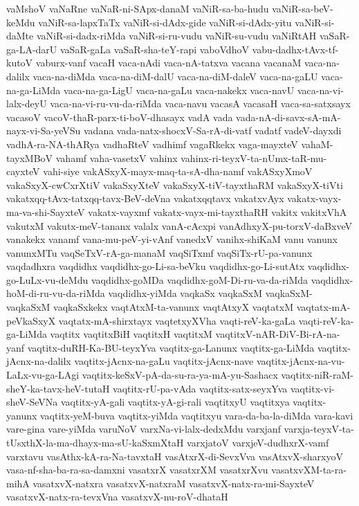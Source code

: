 {vaMshoV
vaNaRne
vaNaR-ni-SApx-danaM
vaNiR-sa-ba-hudu
vaNiR-sa-beV-keMdu
vaNiR-sa-lapxTaTx
vaNiR-si-dAdx-gide
vaNiR-si-dAdx-yitu
vaNiR-si-daMte
vaNiR-si-dadx-riMda
vaNiR-si-ru-vudu
vaNiR-su-vudu
vaNiRtAH
vaSaR-ga-LA-darU
vaSaR-gaLa
vaSaR-sha-teY-rapi
vaboVdhoV
vabu-dadhx-tAvx-tf-kutoV
vaburx-vanf
vacaH
vaca-nAdi
vaca-nA-tatxva
vacana
vacanaM
vaca-na-dalilx
vaca-na-diMda
vaca-na-diM-dalU
vaca-na-diM-daleV
vaca-na-gaLU
vaca-na-ga-LiMda
vaca-na-ga-LigU
vaca-na-gaLu
vaca-nakekx
vaca-navU
vaca-na-vi-lalx-deyU
vaca-na-vi-ru-vu-da-riMda
vaca-navu
vacasA
vacasaH
vaca-sa-satxsayx
vacasoV
vacoV-thaR-parx-ti-boV-dhasayx
vadA
vada
vada-nA-di-savx-sA-mA-nayx-vi-Sa-yeVSu
vadana
vada-natx-shocxV-Sa-rA-di-vatf
vadatf
vadeV-dayxdi
vadhA-ra-NA-thARya
vadhaRteV
vadhimf
vagaRkekx
vaga-mayxteV
vahaM-tayxMBoV
vahamf
vaha-vasetxV
vahinx
vahinx-ri-teyxV-ta-nUmx-taR-mu-cayxteV
vahi-siye
vakASxyX-mayx-maq-ta-sA-dha-namf
vakASxyXmoV
vakaSxyX-cwCxrXtiV
vakaSxyXteV
vakaSxyX-tiV-tayxthaRM
vakaSxyX-tiVti
vakatxqq-tAvx-tatxqq-tavx-BeV-deVna
vakatxqqtavx
vakatxvAyx
vakatx-vayx-ma-va-shi-SayxteV
vakatx-vayxmf
vakatx-vayx-mi-tayxthaRH
vakitx
vakitxVhA
vakutxM
vakutx-meV-tananx
valalx
vanA-cAcxpi
vanAdhxyX-pu-torxV-daBxveV
vanakekx
vanamf
vana-mu-peV-yi-vAnf
vanedxV
vanihx-shiKaM
vanu
vanunx
vanunxMTu
vaqSeTxV-rA-ga-manaM
vaqSiTxmf
vaqSiTx-rU-pa-vanunx
vaqdadhxra
vaqdidhx
vaqdidhx-go-Li-sa-beVku
vaqdidhx-go-Li-sutAtx
vaqdidhx-go-LuLx-vu-deMdu
vaqdidhx-goMDa
vaqdidhx-goM-Di-ru-va-da-riMda
vaqdidhx-hoM-di-ru-vu-da-riMda
vaqdidhx-yiMda
vaqkaSx
vaqkaSxM
vaqkaSxM-vaqkaSxM
vaqkaSxkekx
vaqtAtxM-ta-vanunx
vaqtAtxyX
vaqtatxM
vaqtatx-mA-peVkaSxyX
vaqtatx-mA-shirxtayx
vaqtetxyXVha
vaqti-reV-ka-gaLa
vaqti-reV-ka-ga-LiMda
vaqtitx
vaqtitxBiH
vaqtitxH
vaqtitxM
vaqtitxV-nAR-DiV-Bi-rA-na-yanf
vaqtitx-duRH-Ka-BU-teyxYva
vaqtitx-ga-Lanunx
vaqtitx-ga-LiMda
vaqtitx-jAcnx-na-dalilx
vaqtitx-jAcnx-na-gaLu
vaqtitx-jAcnx-nave
vaqtitx-jAcnx-na-vu-LaLx-vu-ga-LAgi
vaqtitx-keSxV-pA-da-su-ra-ya-mA-yu-Sashacx
vaqtitx-niR-raM-sheY-ka-tavx-heV-tutaH
vaqtitx-rU-pa-vAda
vaqtitx-satx-seyxYva
vaqtitx-vi-sheV-SeVNa
vaqtitx-yA-gali
vaqtitx-yA-gi-rali
vaqtitxyU
vaqtitxya
vaqtitx-yanunx
vaqtitx-yeM-buva
vaqtitx-yiMda
vaqtitxyu
vara-da-ba-la-diMda
vara-kavi
vare-gina
vare-yiMda
varuNoV
varxNa-vi-lalx-dedxMdu
varxjanf
varxja-teyxV-ta-tUsxthX-la-ma-dhayx-ma-sU-kaSxmXtaH
varxjatoV
varxjeV-dudhxrX-vamf
varxtavu
vasAthx-kA-ra-Na-tavxtaH
vasAtxrX-di-SevxVva
vasAtxvX-sharxyoV
vasa-nf-sha-ba-ra-sa-damxni
vasatxrX
vasatxrXM
vasatxrXvu
vasatxvXM-ta-ra-mihA
vasatxvX-natxra
vasatxvX-natxraM
vasatxvX-natx-ra-mi-SayxteV
vasatxvX-natx-ra-tevxVna
vasatxvX-nu-roV-dhataH
}
